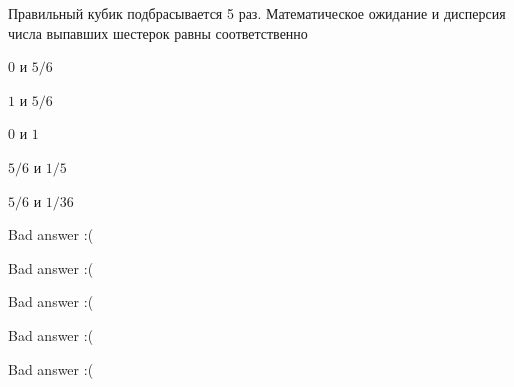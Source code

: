 
\begin{question}
Правильный кубик подбрасывается 5 раз. Математическое ожидание и
дисперсия числа выпавших шестерок равны соответственно
\begin{answerlist}
  \item \(0\) и \(5/6\)
  \item \(1\) и \(5/6\)
  \item \(0\) и \(1\)
  \item \(5/6\) и \(1/5\)
  \item \(5/6\) и \(1/36\)
\end{answerlist}
\end{question}

\begin{solution}
\begin{answerlist}
  \item Bad answer :(
  \item Bad answer :(
  \item Bad answer :(
  \item Bad answer :(
  \item Bad answer :(
\end{answerlist}
\end{solution}

